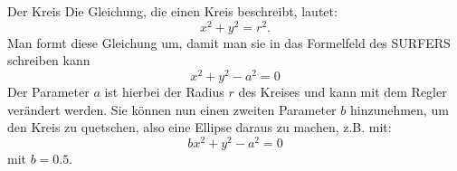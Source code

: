 \begin{surferPage}[Kreis]{Der Kreis}
Die Gleichung, die einen Kreis beschreibt, lautet: 
\[x^2+y^2=r^2.\]
Man formt diese Gleichung um, damit man sie in das Formelfeld des SURFERS schreiben kann
\[x^2+y^2-a^2=0\]
Der Parameter $a$ ist hierbei der Radius $r$ des Kreises und kann mit dem Regler verändert werden. Sie können nun einen zweiten Parameter $b$ hinzunehmen, um den Kreis zu quetschen, also eine Ellipse daraus zu machen, z.B. mit:
\[bx^2+y^2-a^2=0\] mit $b=0.5$.
\end{surferPage}
